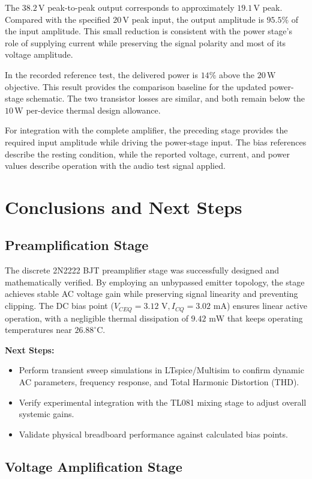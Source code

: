 \documentclass[conference,letterpaper]{IEEEtran}
\newcommand{\V}{\mathrm{V}}
\newcommand{\W}{\mathrm{W}}
\begin{document}
The $38.2\,\V$ peak-to-peak output corresponds to approximately
$19.1\,\V$ peak. Compared with the specified $20\,\V$ peak input,
the output amplitude is $95.5\%$ of the input amplitude. This small
reduction is consistent with the power stage's role of supplying
current while preserving the signal polarity and most of its voltage
amplitude.

In the recorded reference test, the delivered power is $14\%$ above
the $20\,\W$ objective. This result provides the comparison baseline
for the updated power-stage schematic. The two transistor
losses are similar, and both remain below the $10\,\W$ per-device
thermal design allowance.

For integration with the complete amplifier, the preceding stage
provides the required input amplitude while driving the power-stage
input. The bias references describe the resting condition, while the
reported voltage, current, and power values describe operation with
the audio test signal applied.

\section{Conclusions and Next Steps}
\subsection{Preamplification Stage}
The discrete 2N2222 BJT preamplifier stage was successfully designed and mathematically verified. By employing an unbypassed emitter topology, the stage achieves stable AC voltage gain while preserving signal linearity and preventing clipping. The DC bias point ($V_{CEQ} = 3.12\text{~V}, I_{CQ} = 3.02\text{~mA}$) ensures linear active operation, with a negligible thermal dissipation of $9.42\text{~mW}$ that keeps operating temperatures near $26.88^\circ\text{C}$.

\textbf{Next Steps:}
\begin{itemize}
    \item Perform transient sweep simulations in LTspice/Multisim to confirm dynamic AC parameters, frequency response, and Total Harmonic Distortion (THD).
    \item Verify experimental integration with the TL081 mixing stage to adjust overall systemic gains.
    \item Validate physical breadboard performance against calculated bias points.
\end{itemize}

\subsection{Voltage Amplification Stage}
\end{document}
